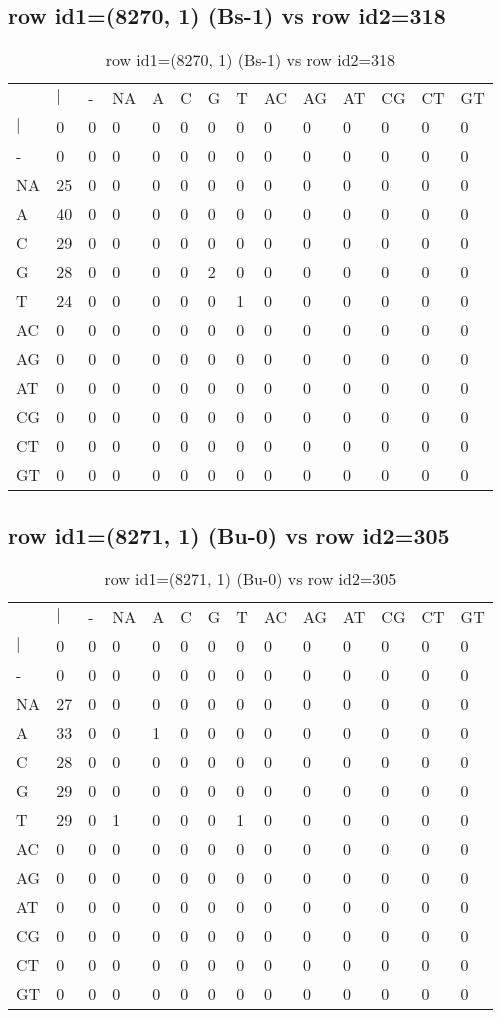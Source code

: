 \subsection{row id1=(8270, 1) (Bs-1) vs row id2=318}
\begin{center}
\begin{longtable}{|l|l|l|l|l|l|l|l|l|l|l|l|l|l|}
\caption{row id1=(8270, 1) (Bs-1) vs row id2=318} \label{table_dm422}\\
\hline
\\
\hline
&$|$&-&NA&A&C&G&T&AC&AG&AT&CG&CT&GT\\
$|$&0&0&0&0&0&0&0&0&0&0&0&0&0\\
-&0&0&0&0&0&0&0&0&0&0&0&0&0\\
NA&25&0&0&0&0&0&0&0&0&0&0&0&0\\
A&40&0&0&0&0&0&0&0&0&0&0&0&0\\
C&29&0&0&0&0&0&0&0&0&0&0&0&0\\
G&28&0&0&0&0&2&0&0&0&0&0&0&0\\
T&24&0&0&0&0&0&1&0&0&0&0&0&0\\
AC&0&0&0&0&0&0&0&0&0&0&0&0&0\\
AG&0&0&0&0&0&0&0&0&0&0&0&0&0\\
AT&0&0&0&0&0&0&0&0&0&0&0&0&0\\
CG&0&0&0&0&0&0&0&0&0&0&0&0&0\\
CT&0&0&0&0&0&0&0&0&0&0&0&0&0\\
GT&0&0&0&0&0&0&0&0&0&0&0&0&0\\
\hline
\end{longtable}
\end{center}

\subsection{row id1=(8271, 1) (Bu-0) vs row id2=305}
\begin{center}
\begin{longtable}{|l|l|l|l|l|l|l|l|l|l|l|l|l|l|}
\caption{row id1=(8271, 1) (Bu-0) vs row id2=305} \label{table_dm424}\\
\hline
\\
\hline
&$|$&-&NA&A&C&G&T&AC&AG&AT&CG&CT&GT\\
$|$&0&0&0&0&0&0&0&0&0&0&0&0&0\\
-&0&0&0&0&0&0&0&0&0&0&0&0&0\\
NA&27&0&0&0&0&0&0&0&0&0&0&0&0\\
A&33&0&0&1&0&0&0&0&0&0&0&0&0\\
C&28&0&0&0&0&0&0&0&0&0&0&0&0\\
G&29&0&0&0&0&0&0&0&0&0&0&0&0\\
T&29&0&1&0&0&0&1&0&0&0&0&0&0\\
AC&0&0&0&0&0&0&0&0&0&0&0&0&0\\
AG&0&0&0&0&0&0&0&0&0&0&0&0&0\\
AT&0&0&0&0&0&0&0&0&0&0&0&0&0\\
CG&0&0&0&0&0&0&0&0&0&0&0&0&0\\
CT&0&0&0&0&0&0&0&0&0&0&0&0&0\\
GT&0&0&0&0&0&0&0&0&0&0&0&0&0\\
\hline
\end{longtable}
\end{center}

